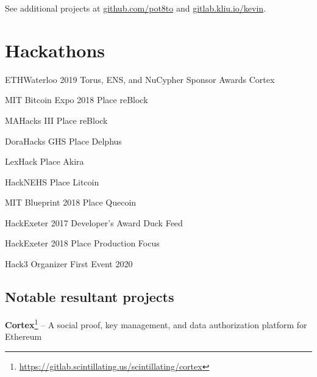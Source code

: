 \documentclass[paper=letter]{tccv}
\begin{document}
See additional projects at \href{https://github.com/pot8to}{github.com/pot8to} and \href{https://gitlab.kliu.io/kevin}{gitlab.kliu.io/kevin}.
    

\section{Hackathons}

\begin{yearlist}

\item{ETHWaterloo 2019}
     {Torus, ENS, and NuCypher Sponsor Awards}
     {Cortex}

\item{MIT Bitcoin Expo 2018}
     { Place}
     {reBlock}

\item{MAHacks III}
     { Place}
     {reBlock}

\item{DoraHacks GHS}
     { Place}
     {Delphus}

\item{LexHack}
     { Place}
     {Akira}

\item{HackNEHS}
     { Place}
     {Litcoin}

\item{MIT Blueprint 2018}
     { Place}
     {Quecoin}

\item{HackExeter 2017}
     {Developer's Award}
     {Duck Feed}

\item{HackExeter 2018}
     { Place}
     {Production Focus}

\item{Hack3}
     {Organizer}
     {First Event 2020}
\end{yearlist}

\subsection{Notable resultant projects}

\textbf{Cortex}\footnote{\url{https://gitlab.scintillating.us/scintillating/cortex}} -- A social proof, key management, and data authorization platform for Ethereum
\end{document}

